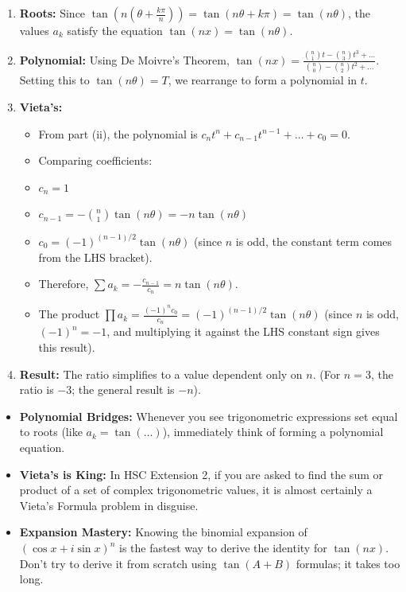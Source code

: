 \begin{solution}
\begin{enumerate}
    \item \textbf{Roots:} Since $\tan\left(n\left(\theta + \frac{k\pi}{n}\right)\right) = \tan(n\theta + k\pi) = \tan(n\theta)$, the values $a_k$ satisfy the equation $\tan(nx) = \tan(n\theta)$.
    \item \textbf{Polynomial:} Using De Moivre’s Theorem, $\tan(nx) = \frac{\binom{n}{1}t - \binom{n}{3}t^3 + \dots}{\binom{n}{0} - \binom{n}{2}t^2 + \dots}$. Setting this to $\tan(n\theta) = T$, we rearrange to form a polynomial in $t$.
    \item \textbf{Vieta's:}
    \begin{itemize}
        \item From part (ii), the polynomial is $c_n t^n + c_{n-1}t^{n-1} + \dots + c_0 = 0$.
        \item Comparing coefficients:
        \item $c_n = 1$
        \item $c_{n-1} = -\binom{n}{1}\tan(n\theta) = -n\tan(n\theta)$
        \item $c_0 = (-1)^{(n-1)/2}\tan(n\theta)$ (since $n$ is odd, the constant term comes from the LHS bracket).
        \item Therefore, $\sum a_k = -\frac{c_{n-1}}{c_n} = n\tan(n\theta)$.
        \item The product $\prod a_k = \frac{(-1)^n c_0}{c_n} = (-1)^{(n-1)/2} \tan(n\theta)$ (since $n$ is odd, $(-1)^n = -1$, and multiplying it against the LHS constant sign gives this result).
    \end{itemize}
    \item \textbf{Result:} The ratio simplifies to a value dependent only on $n$. (For $n=3$, the ratio is $-3$; the general result is $-n$).
\end{enumerate}
\end{solution}

\begin{takeaways}
\begin{itemize}
    \item \textbf{Polynomial Bridges:} Whenever you see trigonometric expressions set equal to roots (like $a_k = \tan(\dots)$), immediately think of forming a polynomial equation.
    \item \textbf{Vieta's is King:} In HSC Extension 2, if you are asked to find the sum or product of a set of complex trigonometric values, it is almost certainly a Vieta's Formula problem in disguise.
    \item \textbf{Expansion Mastery:} Knowing the binomial expansion of $(\cos x + i\sin x)^n$ is the fastest way to derive the identity for $\tan(nx)$. Don't try to derive it from scratch using $\tan(A+B)$ formulas; it takes too long.
\end{itemize}
\end{takeaways}

